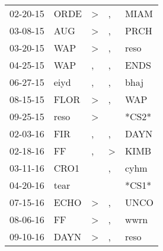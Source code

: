\begin{supertabular}{p{0.07\textwidth}p{0.06\textwidth}p{0.02\textwidth}p{0.02\textwidth}p{0.06\textwidth}}
          02-20-15\textsuperscript{} &           ORDE\textsuperscript{} &     \textgreater &                , &           MIAM\textsuperscript{} \\
          03-08-15\textsuperscript{} &            AUG\textsuperscript{} &     \textgreater &                , &           PRCH\textsuperscript{} \\
          03-20-15\textsuperscript{} &            WAP\textsuperscript{} &     \textgreater &                , &           reso\textsuperscript{} \\
          04-25-15\textsuperscript{} &            WAP\textsuperscript{} &                , &                , &           ENDS\textsuperscript{} \\
          06-27-15\textsuperscript{} &           eiyd\textsuperscript{} &                , &                , &           bhaj\textsuperscript{} \\
          08-15-15\textsuperscript{} &           FLOR\textsuperscript{} &     \textgreater &                , &            WAP\textsuperscript{} \\
          09-25-15\textsuperscript{} &           reso\textsuperscript{} &     \textgreater &                  &                            *CS2* \\
          02-03-16\textsuperscript{} &            FIR\textsuperscript{} &                , &                , &           DAYN\textsuperscript{} \\
          02-18-16\textsuperscript{} &             FF\textsuperscript{} &                , &     \textgreater &           KIMB\textsuperscript{} \\
          03-11-16\textsuperscript{} &           CRO1\textsuperscript{} &                  &                , &           cyhm\textsuperscript{} \\
          04-20-16\textsuperscript{} &           tear\textsuperscript{} &                  &                  &                            *CS1* \\
          07-15-16\textsuperscript{} &           ECHO\textsuperscript{} &     \textgreater &                , &           UNCO\textsuperscript{} \\
          08-06-16\textsuperscript{} &             FF\textsuperscript{} &     \textgreater &                , &           wwrn\textsuperscript{} \\
          09-10-16\textsuperscript{} &           DAYN\textsuperscript{} &     \textgreater &                , &           reso\textsuperscript{} \\

\end{supertabular}
